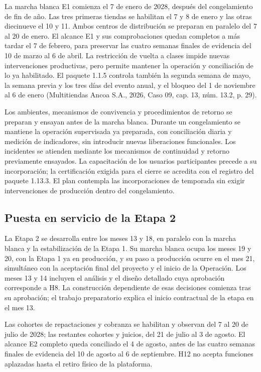 \documentclass[11pt]{article}
\begin{document}
La marcha blanca E1 comienza el 7 de enero de 2028, después del congelamiento de fin de año. Las tres primeras tiendas se habilitan el 7 y 8 de enero y las otras diecinueve el 10 y 11. Ambos centros de distribución se preparan en paralelo del 7 al 20 de enero. El alcance E1 y sus comprobaciones quedan completos a más tardar el 7 de febrero, para preservar las cuatro semanas finales de evidencia del 10 de marzo al 6 de abril. La restricción de vuelta a clases impide nuevas intervenciones productivas, pero permite mantener la operación y conciliación de lo ya habilitado. El paquete 1.1.5 controla también la segunda semana de mayo, la semana previa y los tres días del evento anual, y el bloqueo del 1 de noviembre al 6 de enero (Multitiendas Ancoa S.A., 2026, Caso 09, cap. 13, núm. 13.2, p. 29).

Los ambientes, mecanismos de convivencia y procedimientos de retorno se preparan y ensayan antes de la marcha blanca. Durante un congelamiento se mantiene la operación supervisada ya preparada, con conciliación diaria y medición de indicadores, sin introducir nuevas liberaciones funcionales. Los incidentes se atienden mediante los mecanismos de continuidad y retorno previamente ensayados. La capacitación de los usuarios participantes precede a su incorporación; la certificación exigida para el cierre se acredita con el registro del paquete 1.13.3. El plan contempla las incorporaciones de temporada sin exigir intervenciones de producción dentro del congelamiento.

\subsection*{Puesta en servicio de la Etapa 2}

La Etapa 2 se desarrolla entre los meses 13 y 18, en paralelo con la marcha blanca y la estabilización de la Etapa 1. Su marcha blanca ocupa los meses 19 y 20, con la Etapa 1 ya en producción, y su paso a producción ocurre en el mes 21, simultáneo con la aceptación final del proyecto y el inicio de la Operación. Los meses 13 y 14 incluyen el análisis y el diseño detallado cuya aprobación corresponde a H8. La construcción dependiente de esas decisiones comienza tras su aprobación; el trabajo preparatorio explica el inicio contractual de la etapa en el mes 13.

Las cohortes de repactaciones y cobranza se habilitan y observan del 7 al 20 de julio de 2028; las restantes cohortes y juicios, del 21 de julio al 3 de agosto. El alcance E2 completo queda conciliado el 4 de agosto, antes de las cuatro semanas finales de evidencia del 10 de agosto al 6 de septiembre. H12 no acepta funciones aplazadas hasta el retiro físico de la plataforma.
\end{document}
